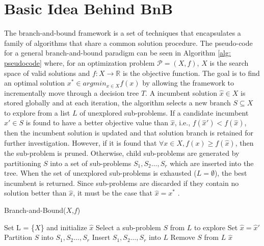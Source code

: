\newpage
\section{Basic Idea Behind BnB}
	The branch-and-bound framework is a set of techniques that encapsulates a family of algorithms that share a common solution procedure. 
	The pseudo-code for a general branch-and-bound paradigm can be seen in Algorithm \ref{alg: pseudocode} where, for an optimization problem $\mathscr{P}=(X,f)$, $X$ is the search space of valid solutions and $f: X \rightarrow \mathbb{R}$ is the objective function. 
	The goal is to find an optimal solution $x^* \in argmin_{x\in X}f(x)$ by allowing the framework to incrementally move through a decision tree $T$.
	A incumbent solution $\hat{x}\in X$ is stored globally and at each iteration, the algorithm selects a new branch $S\subseteq X$ to explore from a list $L$ of unexplored sub-problems. 
	If a candidate incumbent $\hat{x}'\in S$ is found to have a better objective value than $\hat{x}$, i.e., $f(\hat{x}') < f(\hat{x})$, then the incumbent solution is updated and that solution branch is retained for further investigation.
	However, if it is found that $\forall x \in X, f(x) \geq f(\hat{x})$, then the sub-problem is pruned. 
	Otherwise, child sub-problems are generated by partitioning $S$ into a set of sub-problems $S_1, S_2 \dots ,S_r$ which are inserted into the tree.
	When the set of unexplored sub-problems is exhausted ($L = \emptyset$), the best incumbent is returned. 
	Since sub-problems are discarded if they contain no solution better than $\hat{x}$, it must be the case that $\hat{x} = x^*$ \cite{morrison2016branch, huang2021branch,virdi2020development}.
		\begin{algorithm}[H]
			\caption{Branch-and-Bound($X$,$f$) \cite{huang2021branch}}
			\begin{algorithmic}[1]
				\State Set L = \{$X$\} and initialize $\hat{x}$
					\State Select a sub-problem $S$ from $L$ to explore
					\State Set $\hat{x} = \hat{x}'$
					\EndIf
					\State Partition $S$ into $S_1, S_2 \dots ,S_r$
					\State Insert $S_1, S_2 \dots ,S_r$ into $L$
					\EndIf
					\State Remove $S$ from $L$
				\EndWhile
				\State \Return $\hat{x}$
			\end{algorithmic}
		\label{alg: pseudocode}
		\end{algorithm}

		
		
		